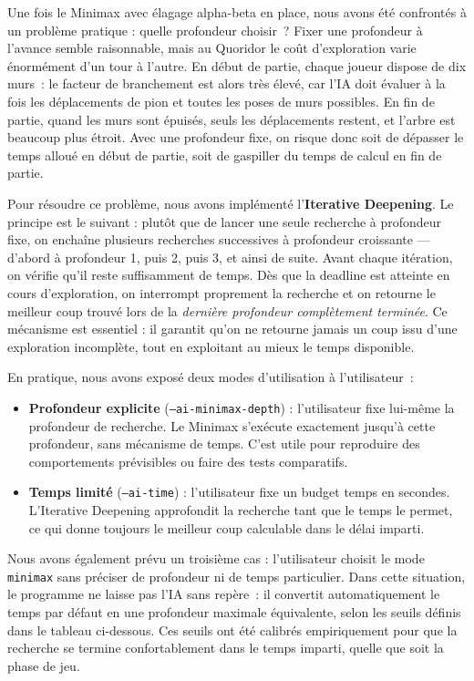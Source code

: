 \documentclass[a4paper]{article}
\begin{document}
Une fois le Minimax avec élagage alpha-beta en place, nous avons été confrontés
à un problème pratique : quelle profondeur choisir~? Fixer une profondeur à
l'avance semble raisonnable, mais au Quoridor le coût d'exploration varie
énormément d'un tour à l'autre. En début de partie, chaque joueur dispose de
dix murs~: le facteur de branchement est alors très élevé, car l'IA doit
évaluer à la fois les déplacements de pion et toutes les poses de murs
possibles. En fin de partie, quand les murs sont épuisés, seuls les déplacements
restent, et l'arbre est beaucoup plus étroit. Avec une profondeur fixe, on
risque donc soit de dépasser le temps alloué en début de partie, soit de
gaspiller du temps de calcul en fin de partie.

Pour résoudre ce problème, nous avons implémenté l'\textbf{Iterative Deepening}.
Le principe est le suivant : plutôt que de lancer une seule recherche à
profondeur fixe, on enchaîne plusieurs recherches successives à profondeur
croissante — d'abord à profondeur 1, puis 2, puis 3, et ainsi de suite. Avant
chaque itération, on vérifie qu'il reste suffisamment de temps. Dès que la
deadline est atteinte en cours d'exploration, on interrompt proprement la
recherche et on retourne le meilleur coup trouvé lors de la \emph{dernière
profondeur complètement terminée}. Ce mécanisme est essentiel : il garantit
qu'on ne retourne jamais un coup issu d'une exploration incomplète, tout en
exploitant au mieux le temps disponible.

\bigskip

En pratique, nous avons exposé deux modes d'utilisation à l'utilisateur~:

\begin{itemize}
  \item \textbf{Profondeur explicite} (\texttt{--ai-minimax-depth}) : l'utilisateur
    fixe lui-même la profondeur de recherche. Le Minimax s'exécute exactement
    jusqu'à cette profondeur, sans mécanisme de temps. C'est utile pour
    reproduire des comportements prévisibles ou faire des tests comparatifs.
  \item \textbf{Temps limité} (\texttt{--ai-time}) : l'utilisateur fixe un budget
    temps en secondes. L'Iterative Deepening approfondit la recherche tant que
    le temps le permet, ce qui donne toujours le meilleur coup calculable dans
    le délai imparti.
\end{itemize}

\bigskip

Nous avons également prévu un troisième cas : l'utilisateur choisit le mode
\texttt{minimax} sans préciser de profondeur ni de temps particulier. Dans cette
situation, le programme ne laisse pas l'IA sans repère~: il convertit
automatiquement le temps par défaut en une profondeur maximale équivalente,
selon les seuils définis dans le tableau ci-dessous. Ces seuils ont été calibrés
empiriquement pour que la recherche se termine confortablement dans le temps
imparti, quelle que soit la phase de jeu.
\end{document}
